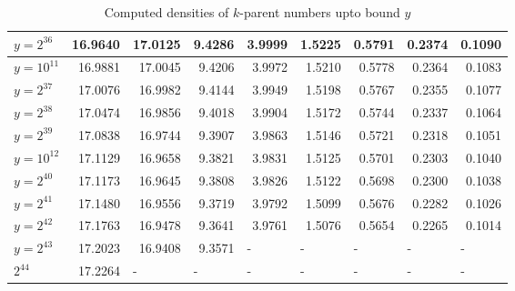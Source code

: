 \documentclass{article}
\theoremstyle{definition}
\begin{document}
\begin{table}[h!]
\begin{tabular}{l | rrrrrrrr}
        $y = 2^{36}$  & 16.9640 & 17.0125               & 9.4286                & 3.9999                & 1.5225                & 0.5791                & 0.2374                & 0.1090                \\
        \hline
        $y = 10^{11}$ & 16.9881 & 17.0045               & 9.4206                & 3.9972                & 1.5210                & 0.5778                & 0.2364                & 0.1083                \\
        \hline
        $y = 2^{37}$  & 17.0076 & 16.9982               & 9.4144                & 3.9949                & 1.5198                & 0.5767                & 0.2355                & 0.1077                \\
        $y = 2^{38}$  & 17.0474 & 16.9856               & 9.4018                & 3.9904                & 1.5172                & 0.5744                & 0.2337                & 0.1064                \\
        $y = 2^{39}$  & 17.0838 & 16.9744               & 9.3907                & 3.9863                & 1.5146                & 0.5721                & 0.2318                & 0.1051                \\
        \hline
        $y = 10^{12}$ & 17.1129 & 16.9658               & 9.3821                & 3.9831                & 1.5125                & 0.5701                & 0.2303                & 0.1040                \\
        \hline
        $y = 2^{40}$  & 17.1173 & 16.9645               & 9.3808                & 3.9826                & 1.5122                & 0.5698                & 0.2300                & 0.1038                \\
        $y = 2^{41}$  & 17.1480 & 16.9556               & 9.3719                & 3.9792                & 1.5099                & 0.5676                & 0.2282                & 0.1026                \\
        $y = 2^{42}$  & 17.1763 & 16.9478               & 9.3641                & 3.9761                & 1.5076                & 0.5654                & 0.2265                & 0.1014                \\
        $y = 2^{43}$  & 17.2023 & 16.9408               & 9.3571                & \multicolumn{1}{l}{-} & \multicolumn{1}{l}{-} & \multicolumn{1}{l}{-} & \multicolumn{1}{l}{-} & \multicolumn{1}{l}{-} \\
        $2^{44}$  & 17.2264 & \multicolumn{1}{l}{-} & \multicolumn{1}{l}{-} & \multicolumn{1}{l}{-} & \multicolumn{1}{l}{-} & \multicolumn{1}{l}{-} & \multicolumn{1}{l}{-} & \multicolumn{1}{l}{-}
    \end{tabular}

    \caption{Computed densities of $k$-parent numbers upto bound $y$}
\end{table}
\pagebreak
\end{document}
